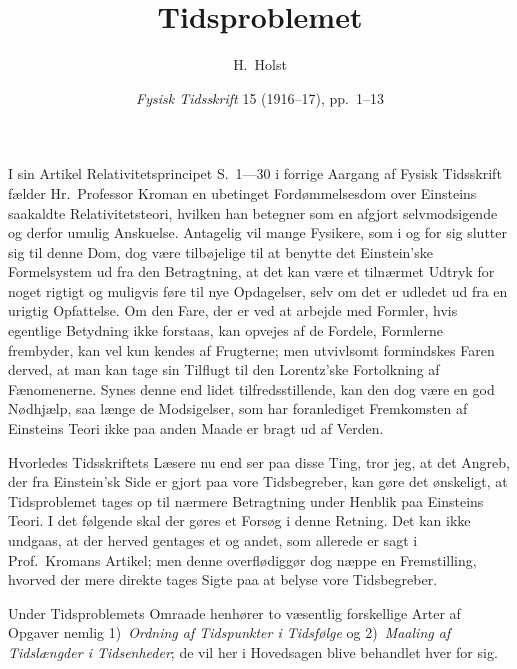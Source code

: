 \documentclass[12pt,a4paper]{article}
\title{\textbf{\guillemotright Tidsproblemet\guillemotleft}}
\author{H.\ Holst}
\date{\textit{Fysisk Tidsskrift} 15 (1916--17), pp.~1--13}
\newcommand{\opage}[1]{\marginnote{\footnotesize\textit{[#1]}}}
\begin{document}
\maketitle

\opage{1} %
I sin Artikel \guillemotright Relativitetsprincipet\guillemotleft{} S.~1---30 i
forrige Aargang af \guillemotright Fysisk Tidsskrift\guillemotleft{} fælder
Hr.~Professor Kroman en ubetinget Fordømmelsesdom over Einsteins saakaldte
Relativitetsteori, hvilken han betegner som \guillemotright en afgjort
selvmodsigende og derfor umulig Anskuelse\guillemotleft. Antagelig vil mange
Fysikere, som i og for sig slutter sig til denne Dom, dog være tilbøjelige til
at benytte det Einstein'ske Formelsystem ud fra den Betragtning, at det kan
være et tilnærmet Udtryk for noget rigtigt og muligvis føre til nye Opdagelser,
selv om det er udledet ud fra en urigtig Opfattelse. Om den Fare, der er ved at
arbejde med Formler, hvis egentlige Betydning ikke forstaas, kan opvejes af de
Fordele, Formlerne frembyder, kan vel kun kendes af Frugterne; men utvivlsomt
formindskes Faren derved, at man kan tage sin Tilflugt til den Lorentz'ske
Fortolkning af Fænomenerne. Synes denne end lidet tilfredsstillende, kan den
dog være en god Nødhjælp, saa længe de Modsigelser, som har foranlediget
Fremkomsten af Einsteins Teori ikke paa anden Maade er bragt ud af Verden.

Hvorledes Tidsskriftets Læsere nu end ser paa disse Ting, tror jeg, at det
Angreb, der fra Einstein'sk Side er gjort paa vore Tidsbegreber, kan gøre det
ønskeligt, at Tidsproblemet tages op til nærmere Betragtning under Henblik paa
Einsteins Teori. I det følgende skal der gøres et Forsøg i denne Retning. Det
kan ikke undgaas, at der herved gentages et og andet, som allerede er sagt i
Prof.\ Kromans Artikel; men denne overflødiggør dog næppe en Fremstilling,
hvorved der mere direkte tages Sigte paa at belyse vore Tidsbegreber.

\opage{2} %
Under Tidsproblemets Omraade henhører to væsentlig forskellige Arter af Opgaver
nemlig 1)~\emph{Ordning af Tidspunkter i Tidsfølge} og 2)~\emph{Maaling af
Tidslængder i Tidsenheder}; de vil her i Hovedsagen blive behandlet hver for
sig.
\end{document}
